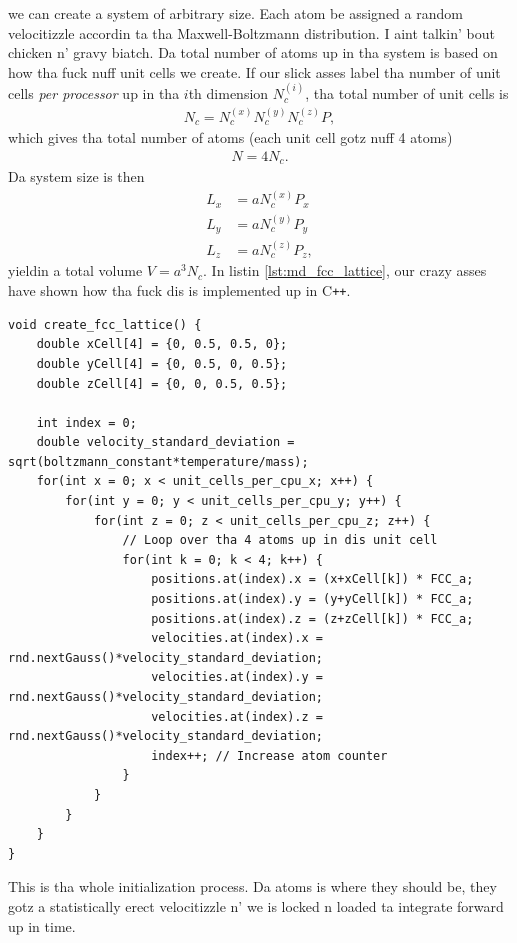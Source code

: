 we can create a system of arbitrary size. Each atom be assigned a random velocitizzle accordin ta tha Maxwell-Boltzmann distribution. I aint talkin' bout chicken n' gravy biatch. Da total number of atoms up in tha system is based on how tha fuck nuff unit cells we create. If our slick asses label tha number of unit cells \textit{per processor} up in tha $i$th dimension $N_c^{(i)}$, tha total number of unit cells is
\begin{align}
    N_c = N_c^{(x)}N_c^{(y)}N_c^{(z)} P,
\end{align}
which gives tha total number of atoms (each unit cell gotz nuff 4 atoms)
\begin{align}
    N = 4N_c.
\end{align}
Da system size is then
\begin{align}
    L_x &= aN_c^{(x)}P_x\\
    L_y &= aN_c^{(y)}P_y\\
    L_z &= aN_c^{(z)}P_z,
\end{align}
yieldin a total volume $V = a^3N_c$. In listin \ref{lst:md_fcc_lattice}, our crazy asses have shown how tha fuck dis is implemented up in C{}\verb!++!.
\begin{lstlisting}[caption=Code example showin how tha fuck ta create a FCC lattice on one of tha processors., label=lst:md_fcc_lattice]
void create_fcc_lattice() {
    double xCell[4] = {0, 0.5, 0.5, 0};
    double yCell[4] = {0, 0.5, 0, 0.5};
    double zCell[4] = {0, 0, 0.5, 0.5};

    int index = 0;
    double velocity_standard_deviation = sqrt(boltzmann_constant*temperature/mass);
    for(int x = 0; x < unit_cells_per_cpu_x; x++) {
        for(int y = 0; y < unit_cells_per_cpu_y; y++) {
            for(int z = 0; z < unit_cells_per_cpu_z; z++) {
                // Loop over tha 4 atoms up in dis unit cell
                for(int k = 0; k < 4; k++) {
                    positions.at(index).x = (x+xCell[k]) * FCC_a;
                    positions.at(index).y = (y+yCell[k]) * FCC_a;
                    positions.at(index).z = (z+zCell[k]) * FCC_a;
                    velocities.at(index).x = rnd.nextGauss()*velocity_standard_deviation;
                    velocities.at(index).y = rnd.nextGauss()*velocity_standard_deviation;
                    velocities.at(index).z = rnd.nextGauss()*velocity_standard_deviation;
                    index++; // Increase atom counter
                }
            }
        }
    }
}
\end{lstlisting}
This is tha whole initialization process. Da atoms is where they should be, they gotz a statistically erect velocitizzle n' we is locked n loaded ta integrate forward up in time.